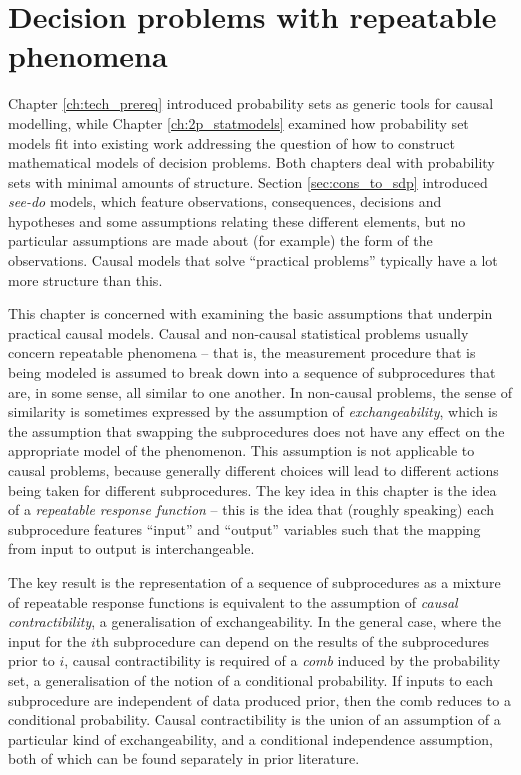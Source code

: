
\chapter{Decision problems with repeatable phenomena}\label{ch:evaluating_decisions}

Chapter \ref{ch:tech_prereq} introduced probability sets as generic tools for causal modelling, while Chapter \ref{ch:2p_statmodels} examined how probability set models fit into existing work addressing the question of how to construct mathematical models of decision problems. Both chapters deal with probability sets with minimal amounts of structure. Section \ref{sec:cons_to_sdp} introduced \emph{see-do} models, which feature observations, consequences, decisions and hypotheses and some assumptions relating these different elements, but no particular assumptions are made about (for example) the form of the observations. Causal models that solve ``practical problems'' typically have a lot more structure than this.

This chapter is concerned with examining the basic assumptions that underpin practical causal models. Causal and non-causal statistical problems usually concern repeatable phenomena -- that is, the measurement procedure that is being modeled is assumed to break down into a sequence of subprocedures that are, in some sense, all similar to one another. In non-causal problems, the sense of similarity is sometimes expressed by the assumption of \emph{exchangeability}, which is the assumption that swapping the subprocedures does not have any effect on the appropriate model of the phenomenon. This assumption is not applicable to causal problems, because generally different choices will lead to different actions being taken for different subprocedures. The key idea in this chapter is the idea of a \emph{repeatable response function} -- this is the idea that (roughly speaking) each subprocedure features ``input'' and ``output'' variables such that the mapping from input to output is interchangeable.

The key result is the representation of a sequence of subprocedures as a mixture of repeatable response functions is equivalent to the assumption of \emph{causal contractibility}, a generalisation of exchangeability. In the general case, where the input for the $i$th subprocedure can depend on the results of the subprocedures prior to $i$, causal contractibility is required of a \emph{comb} induced by the probability set, a generalisation of the notion of a conditional probability. If inputs to each subprocedure are independent of data produced prior, then the comb reduces to a conditional probability. Causal contractibility is the union of an assumption of a particular kind of exchangeability, and a conditional independence assumption, both of which can be found separately in prior literature.

